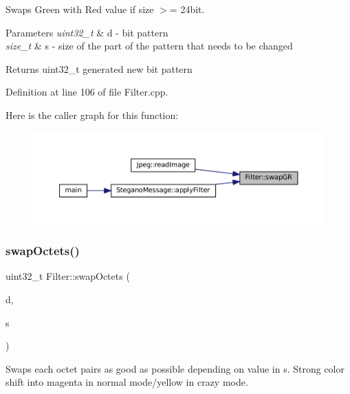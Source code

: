 Swaps Green with Red value if size $>$= 24bit. 


\begin{DoxyParams}{Parameters}
{\em uint32\+\_\+t} & d -\/ bit pattern \\
\hline
{\em size\+\_\+t} & s -\/ size of the part of the pattern that needs to be changed \\
\hline
\end{DoxyParams}
\begin{DoxyReturn}{Returns}
uint32\+\_\+t generated new bit pattern 
\end{DoxyReturn}


Definition at line 106 of file Filter.\+cpp.

Here is the caller graph for this function\+:
\nopagebreak
\begin{figure}[H]
\begin{center}
\leavevmode
\includegraphics[width=350pt]{classFilter_ad6f109289f21be75db0a1351c86d3143_icgraph}
\end{center}
\end{figure}
\mbox{\label{classFilter_aeb85c27a3d80540f2bd4b5f314543d4c}} 
\subsubsection{\texorpdfstring{swapOctets()}{swapOctets()}}
{\footnotesize\ttfamily uint32\+\_\+t Filter\+::swap\+Octets (\begin{DoxyParamCaption}\item[{uint32\+\_\+t}]{d,  }\item[{size\+\_\+t}]{s }\end{DoxyParamCaption})\hspace{0.3cm}{\ttfamily [static]}}



Swaps each octet pairs as good as possible depending on value in s. Strong color shift into magenta in normal mode/yellow in crazy mode. 



